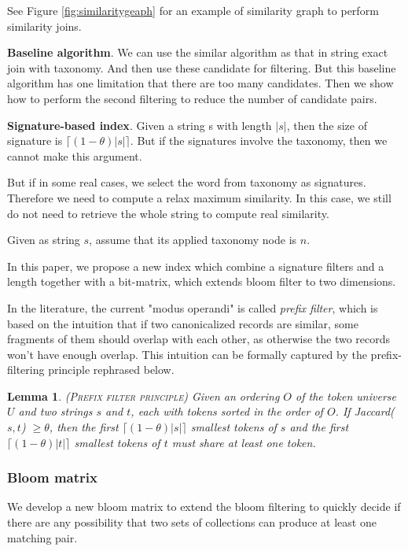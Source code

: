 \documentclass{sig-alternate}
\newtheorem{lem}[theorem]{Lemma}
\renewcommand{\geq}{\geqslant}
\begin{document}
See Figure \ref{fig:similaritygeaph} for an example of similarity graph to perform similarity joins.

\textbf{Baseline algorithm}. We can use the similar algorithm as that in string exact join with taxonomy. And then use these candidate for filtering. But this baseline algorithm has one limitation that there are too many candidates. Then we show how to perform the second filtering to reduce the number of candidate pairs.

\textbf{Signature-based index}. Given a string s with length $|s|$, then the size of signature is $\lceil (1-\theta)|s| \rceil$. But if the signatures involve the taxonomy, then we cannot make this argument.

But if in some real cases, we select the word from taxonomy as signatures. Therefore we need to compute a relax maximum similarity. In this case, we still do not need to retrieve the whole string to compute real similarity.

Given as string $s$, assume that its applied taxonomy node is $n$.

In this paper, we propose a new index which combine a signature filters and a length together with a bit-matrix, which extends bloom filter to two dimensions.

In the literature, the current "modus operandi" is called \textit{prefix filter}, which is based on the intuition that if two canonicalized records are similar, some fragments of them should overlap with each other, as otherwise the two records
won't have enough overlap. This intuition can be formally captured by the prefix-filtering
principle \cite{conf/icde/ChaudhuriGK06} rephrased below.

\begin{lem} (\textsc{Prefix filter principle}) \cite{conf/icde/ChaudhuriGK06} Given an
ordering $O$ of the token universe $U$ and two strings $s$ and $t$, each with tokens sorted in the
order of $O$.   If Jaccard($s, t$) $\geq \theta$, then the first $\lceil(1-\theta)|s|\rceil$ smallest
tokens of $s$ and the first $\lceil(1-\theta)|t|\rceil$ smallest
tokens of $t$  must share at least one token.
\end{lem}

\subsubsection{Bloom matrix}

We develop a new bloom matrix to extend the bloom filtering to quickly decide if there are any possibility that two sets of collections can produce at least one matching pair.
\end{document}
